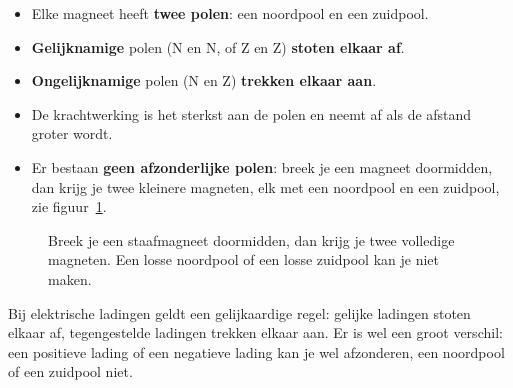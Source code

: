 \documentclass{ximera}
\begin{document}
\begin{proposition}[foldable=true,title={Eigenschappen van permanente magneten}]\nl
    \begin{itemize}
        \item Elke magneet heeft \textbf{twee polen}: een noordpool en een zuidpool.
        \item \textbf{Gelijknamige} polen (N en N, of Z en Z) \textbf{stoten elkaar af}.
        \item \textbf{Ongelijknamige} polen (N en Z) \textbf{trekken elkaar aan}.
        \item De krachtwerking is het sterkst aan de polen en neemt af als de afstand groter wordt.
        \item Er bestaan \textbf{geen afzonderlijke polen}: breek je een magneet doormidden, dan krijg je twee kleinere magneten, elk met een noordpool en een zuidpool, zie figuur~\ref{fig:gebroken_magneet}.
    \end{itemize}
\end{proposition}

\begin{figure}[ht!]
    \captionsetup{width=0.85\textwidth}
    \begin{center}
    \end{center}
    \caption{Breek je een staafmagneet doormidden, dan krijg je twee volledige magneten. Een losse noordpool of een losse zuidpool kan je niet maken.}
    \label{fig:gebroken_magneet}
\end{figure}

\begin{remark}[expandable=true,title={Vergelijking met elektrische ladingen}]\nl
    Bij elektrische ladingen geldt een gelijkaardige regel: gelijke ladingen stoten elkaar af, tegengestelde ladingen trekken elkaar aan. Er is wel een groot verschil: een positieve lading of een negatieve lading kan je wel afzonderen, een noordpool of een zuidpool niet.
\end{remark}
\end{document}
